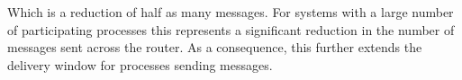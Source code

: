 Which is a reduction of half as many messages.
For systems with a large number of participating processes this represents a significant reduction in the number of messages sent across the router.
As a consequence, this further extends the delivery window for processes sending messages.

%
%
%
%
%
%
%
